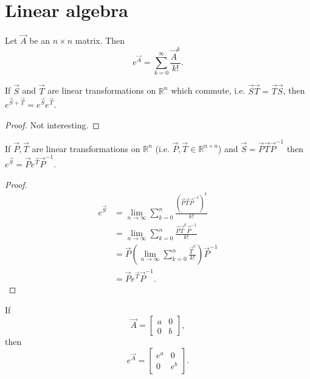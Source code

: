 \section{Linear algebra}
\begin{definition}
	Let $\vec A$ be an $n \times n$ matrix. Then
	\begin{equation}
		e^{\vec A} = \sum_{k = 0}^\infty \frac{\vec A^k}{k!}.
	\end{equation}
\end{definition}

\begin{proposition} %
	\label{prop:la:commute}
	If $\vec S$ and $\vec T$ are linear transformations on $\mathbb R^n$ which commute, i.e. $\vec S \vec T = \vec T \vec S$, then $e^{\vec S + \vec T} = e^{\vec S}e^{\vec T}$.
\end{proposition}

\begin{proof}
	Not interesting.
\end{proof}

\begin{proposition} %
	\label{prop:la:ptp}
	If $\vec P, \vec T$ are linear transformations on $\mathbb R^n$ (i.e. $\vec P, \vec T \in \mathbb R^{n \times n}$) and $\vec S = \vec P \vec T \vec P^{-1}$ then $e^{\vec S} = \vec P e^{\vec T} \vec P^{-1}$.
\end{proposition}

\begin{proof}
	\begin{align*}
		e^{\vec S} 	&= \lim_{n \to \infty} \sum_{k = 0}^n \frac{(\vec P \vec T \vec P^{-1})^k}{k!} \\
						&= \lim_{n \to \infty} \sum_{k = 0}^n \frac{\vec P \vec T^k \vec P^{-1}}{k!} \\
						&= \vec P \left(\lim_{n \to \infty} \sum_{k = 0}^n \frac{\vec T^k}{k!} \right) \vec P^{-1} \\
						&= \vec P e^{\vec T} \vec P^{-1}.
	\end{align*}
\end{proof}

\begin{proposition}
	\label{prop:la:distinct}
	If
	\begin{equation*}
		\vec A =
		\begin{bmatrix}
			a & 0 \\
			0 & b
		\end{bmatrix},
	\end{equation*}
	then
	\begin{equation*}
		e^{\vec A} =
		\begin{bmatrix}
			e^a & 0 \\
			0 & e^b
		\end{bmatrix}.
	\end{equation*}
\end{proposition}

